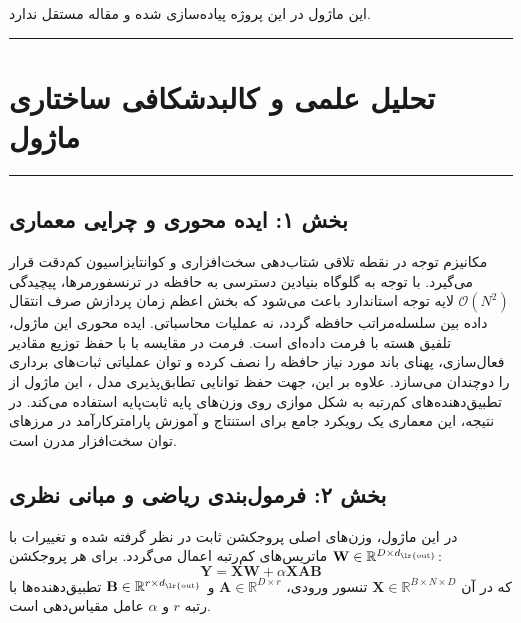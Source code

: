 \clearpage
{}
\vspace*{0.2cm}

این ماژول در این پروژه پیاده‌سازی شده و مقاله مستقل ندارد.
\noindent\rule{\textwidth}{1.2pt}
\vspace*{0.1cm}
\section{تحلیل علمی و کالبدشکافی ساختاری ماژول }
\label{sec:mod_flash_attention3_fp8}
\vspace*{-0.2cm}
\noindent\rule{\textwidth}{0.5pt}
\vspace*{0.3cm}

\subsection*{بخش ۱: ایده محوری و چرایی معماری }
مکانیزم توجه  در نقطه تلاقی شتاب‌دهی سخت‌افزاری و کوانتایزاسیون کم‌دقت قرار می‌گیرد. با توجه به گلوگاه بنیادین دسترسی به حافظه  در ترنسفورمرها، پیچیدگی $\mathcal{O}(N^2)$ لایه توجه استاندارد باعث می‌شود که بخش اعظم زمان پردازش صرف انتقال داده بین سلسله‌مراتب حافظه گردد، نه عملیات محاسباتی. ایده محوری این ماژول، تلفیق هسته  با فرمت داده‌ای  است.
فرمت  در مقایسه با  با حفظ توزیع مقادیر فعال‌سازی، پهنای باند مورد نیاز حافظه را نصف کرده و توان عملیاتی ثبات‌های برداری را دوچندان می‌سازد. علاوه بر این، جهت حفظ توانایی تطابق‌پذیری مدل ، این ماژول از تطبیق‌دهنده‌های کم‌رتبه  به شکل موازی روی وزن‌های پایه ثابت‌پایه  استفاده می‌کند. در نتیجه، این معماری یک رویکرد جامع برای استنتاج و آموزش پارامتر‌کارآمد در مرزهای توان سخت‌افزار مدرن است.

\subsection*{بخش ۲: فرمول‌بندی ریاضی و مبانی نظری }
در این ماژول، وزن‌های اصلی پروجکشن ثابت  در نظر گرفته شده و تغییرات با ماتریس‌های کم‌رتبه  اعمال می‌گردد. برای هر پروجکشن $\mathbf{W} \in \mathbb{R}^{D \times d_{\text{\lr{out}}}}$:
\begin{equation}
\mathbf{Y} = \mathbf{X} \mathbf{W} + \alpha \mathbf{X} \mathbf{A} \mathbf{B}
\end{equation}
که در آن $\mathbf{X} \in \mathbb{R}^{B \times N \times D}$ تنسور ورودی، $\mathbf{A} \in \mathbb{R}^{D \times r}$ و $\mathbf{B} \in \mathbb{R}^{r \times d_{\text{\lr{out}}}}$ تطبیق‌دهنده‌ها با رتبه $r$  و $\alpha$ عامل مقیاس‌دهی است.

